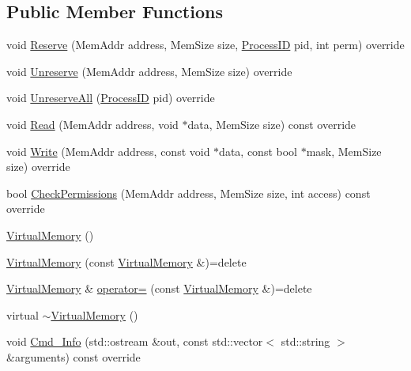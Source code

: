 \subsection*{Public Member Functions}
\begin{DoxyCompactItemize}
\item 
void \hyperlink{class_simulator_1_1_virtual_memory_a40315600da5a22633c0f4215bba22c74}{Reserve} (Mem\+Addr address, Mem\+Size size, \hyperlink{namespace_simulator_a62ef2d2c77bd54a16c39881f6266875e}{Process\+I\+D} pid, int perm) override
\item 
void \hyperlink{class_simulator_1_1_virtual_memory_ab509dcc17a390021d082424335c400de}{Unreserve} (Mem\+Addr address, Mem\+Size size) override
\item 
void \hyperlink{class_simulator_1_1_virtual_memory_aae5d9c5c0d2751e8d816231c8b9c7c7e}{Unreserve\+All} (\hyperlink{namespace_simulator_a62ef2d2c77bd54a16c39881f6266875e}{Process\+I\+D} pid) override
\item 
void \hyperlink{class_simulator_1_1_virtual_memory_a70bfd5a3e806d033ccee7b1e95de6a04}{Read} (Mem\+Addr address, void $\ast$data, Mem\+Size size) const override
\item 
void \hyperlink{class_simulator_1_1_virtual_memory_a67ed4e5b7292e633bc3d62f8995f81a1}{Write} (Mem\+Addr address, const void $\ast$data, const bool $\ast$mask, Mem\+Size size) override
\item 
bool \hyperlink{class_simulator_1_1_virtual_memory_ae4fb1aa425a6593a0a4973c846d21740}{Check\+Permissions} (Mem\+Addr address, Mem\+Size size, int access) const override
\item 
\hyperlink{class_simulator_1_1_virtual_memory_a35414c1541b76d82fc67ac6aa28f8691}{Virtual\+Memory} ()
\item 
\hyperlink{class_simulator_1_1_virtual_memory_ab0c8680a6c5eab7a9c44c87a55127405}{Virtual\+Memory} (const \hyperlink{class_simulator_1_1_virtual_memory}{Virtual\+Memory} \&)=delete
\item 
\hyperlink{class_simulator_1_1_virtual_memory}{Virtual\+Memory} \& \hyperlink{class_simulator_1_1_virtual_memory_a691b3f8ff903c2d8b2ca1f79e45436a5}{operator=} (const \hyperlink{class_simulator_1_1_virtual_memory}{Virtual\+Memory} \&)=delete
\item 
virtual \hyperlink{class_simulator_1_1_virtual_memory_a3557283bed40f0375381b4204fa04722}{$\sim$\+Virtual\+Memory} ()
\item 
void \hyperlink{class_simulator_1_1_virtual_memory_ad4d404ecffae173e02714747a5917b20}{Cmd\+\_\+\+Info} (std\+::ostream \&out, const std\+::vector$<$ std\+::string $>$ \&arguments) const override

\end{DoxyCompactItemize}
